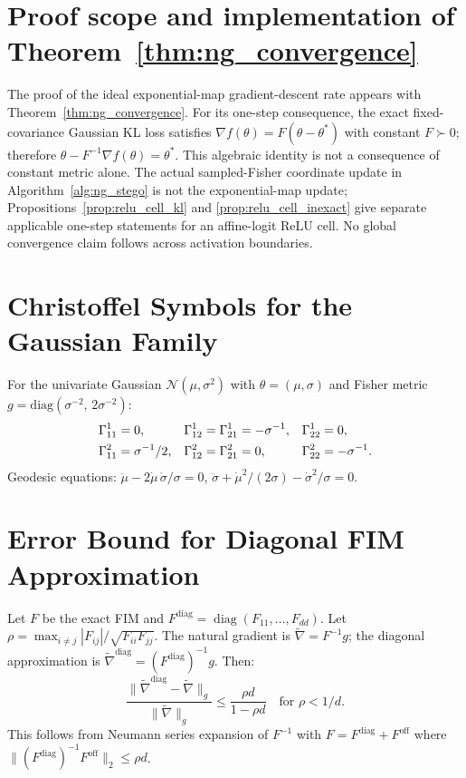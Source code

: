\documentclass[a4paper,fleqn]{cas-dc}
\DeclareMathOperator{\diag}{diag}
\newcommand{\natgrad}{\widetilde{\nabla}}
\begin{document}
\section{Proof scope and implementation of Theorem~\ref{thm:ng_convergence}}
\label{app:ng_convergence}
The proof of the ideal exponential-map gradient-descent rate appears
with Theorem~\ref{thm:ng_convergence}. For its one-step consequence,
the exact fixed-covariance Gaussian KL loss satisfies
$\nabla f(\theta)=F(\theta-\theta^*)$ with constant $F\succ0$;
therefore $\theta-F^{-1}\nabla f(\theta)=\theta^*$.
This algebraic identity is not a consequence of constant metric alone.
The actual sampled-Fisher coordinate update in
Algorithm~\ref{alg:ng_stego} is not the exponential-map update;
Propositions~\ref{prop:relu_cell_kl} and
\ref{prop:relu_cell_inexact} give separate applicable one-step
statements for an affine-logit ReLU cell. No global convergence claim
follows across activation boundaries.

\section{Christoffel Symbols for the Gaussian Family}
\label{app:christoffel_gaussian}

For the univariate Gaussian $\mathcal{N}(\mu,\sigma^2)$ with
$\theta=(\mu,\sigma)$ and Fisher metric
$g = \mathrm{diag}(\sigma^{-2},\,2\sigma^{-2})$:
\begin{align}
  \Gamma_{11}^1 &= 0, & \Gamma_{12}^1 = \Gamma_{21}^1 &= -\sigma^{-1},
  & \Gamma_{22}^1 &= 0, \notag\\
  \Gamma_{11}^2 &= \sigma^{-1}/2, & \Gamma_{12}^2 = \Gamma_{21}^2 &= 0,
  & \Gamma_{22}^2 &= -\sigma^{-1}.
\end{align}
Geodesic equations: $\ddot\mu - 2\dot\mu\,\dot\sigma/\sigma = 0$,
$\ddot\sigma + \dot\mu^2/(2\sigma) - \dot\sigma^2/\sigma = 0$.

\section{Error Bound for Diagonal FIM Approximation}
\label{app:diag_error}

Let $F$ be the exact FIM and $F^{\mathrm{diag}} = \diag(F_{11},\ldots,F_{dd})$.
Let $\rho = \max_{i\neq j} |F_{ij}| / \sqrt{F_{ii}F_{jj}}$.
The natural gradient is $\natgrad = F^{-1}g$; the diagonal approximation
is $\natgrad^{\mathrm{diag}} = (F^{\mathrm{diag}})^{-1}g$.
Then:
\[
  \frac{\|\natgrad^{\mathrm{diag}} - \natgrad\|_g}{\|\natgrad\|_g}
  \leq \frac{\rho d}{1 - \rho d} \quad \text{for } \rho < 1/d.
\]
This follows from Neumann series expansion of $F^{-1}$ with
$F = F^{\mathrm{diag}} + F^{\mathrm{off}}$ where
$\| (F^{\mathrm{diag}})^{-1} F^{\mathrm{off}} \|_2 \leq \rho d$.
\end{document}
